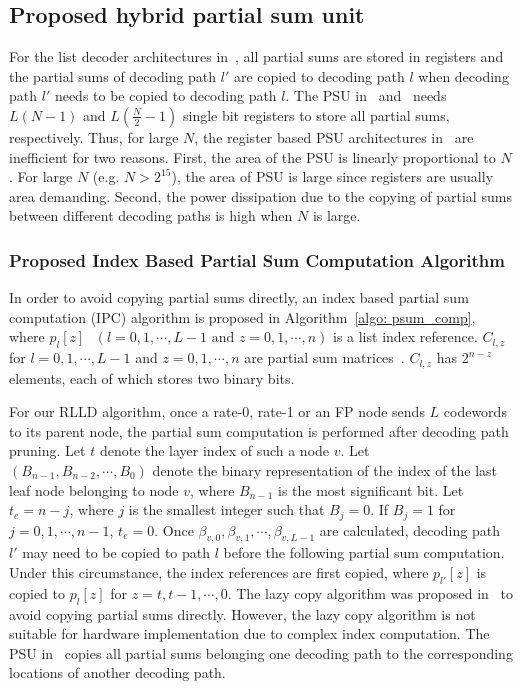 \documentclass[journal]{IEEEtran}
\begin{document}
\subsection{Proposed hybrid partial sum unit} \label{ssec: top_archi}
For the list decoder architectures in~\cite{tree_list_dec, jun_low_mem_list}, all partial sums are stored in registers and the partial sums of decoding path $l'$ are copied to decoding path $l$ when decoding path $l'$ needs to be copied to decoding path $l$. The PSU in~\cite{tree_list_dec} and~\cite{jun_low_mem_list} needs $L(N-1)$ and $L(\frac{N}{2}-1)$ single bit registers to store all partial sums, respectively. Thus, for large $N$, the register based PSU architectures in~\cite{tree_list_dec, jun_low_mem_list} are inefficient for two reasons. First, the area of the PSU is linearly proportional to $N$. For large $N$ (e.g. $N>2^{15}$), the area of PSU is large since registers are usually area demanding. Second, the power dissipation due to the copying of partial sums between different decoding paths is high when $N$ is large. 
\subsubsection{Proposed Index Based Partial Sum Computation Algorithm} \label{ssec: mld}
In order to avoid copying partial sums directly, an index based partial sum computation (IPC) algorithm is proposed in Algorithm~\ref{algo: psum_comp}, where $p_l[z]\mbox{ }(l=0,1,\cdots,L-1\mbox{ and }z=0,1,\cdots,n)$ is a list index reference. $C_{l,z}$ for $l=0,1,\cdots,L-1$ and $z=0,1,\cdots,n$ are partial sum matrices~\cite{ido_it, jun_low_mem_list}. $C_{l,z}$ has $2^{n-z}$ elements, each of which stores two binary bits.

For our RLLD algorithm, once a rate-0, rate-1 or an FP node sends $L$ codewords to its parent node, the partial sum computation is performed after decoding path pruning. Let $t$ denote the layer index of such a node $v$. Let $(B_{n-1}, B_{n-2},\cdots, B_0)$ denote the binary representation of the index of the last leaf node belonging to node $v$, where $B_{n-1}$ is the most significant bit. Let $t_e = n-j$, where $j$ is the smallest integer such that $B_j =0$. If $B_j=1$ for $j=0,1,\cdots,n-1$, $t_e=0$.
Once $\beta_{v,0}, \beta_{v,1},\cdots,\beta_{v,L-1}$ are calculated, decoding path $l'$ may need to be copied to path $l$ before the following partial sum computation. Under this circumstance, the index references are first copied, where $p_{l'}[z]$ is copied to $p_l[z]$ for $z=t, t-1, \cdots,0$. The lazy copy algorithm was proposed in~\cite{ido_it} to avoid copying partial sums directly. However, the lazy copy algorithm is not suitable for hardware implementation due to complex index computation. The PSU in~\cite{jun_low_mem_list} copies all partial sums belonging one decoding path to the corresponding locations of another decoding path.
\end{document}
